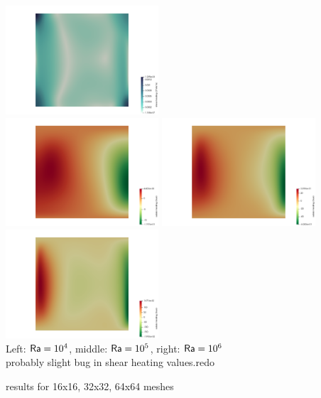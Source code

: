 \begin{center}
\includegraphics[width=5.7cm]{python_codes/fieldstone_110/results_EBA/sh_1e6}\\
\includegraphics[width=5.7cm]{python_codes/fieldstone_110/results_EBA/adiab_1e4}
\includegraphics[width=5.7cm]{python_codes/fieldstone_110/results_EBA/adiab_1e5}
\includegraphics[width=5.7cm]{python_codes/fieldstone_110/results_EBA/adiab_1e6}\\
{\captionfont Left: ${\mathsf{Ra}}=10^4$, middle: ${\mathsf{Ra}}=10^5$, right: ${\mathsf{Ra}}=10^6$}\\
probably slight bug in shear heating values.redo 
\end{center}

\newpage
\aspect results for 16x16, 32x32, 64x64 meshes

